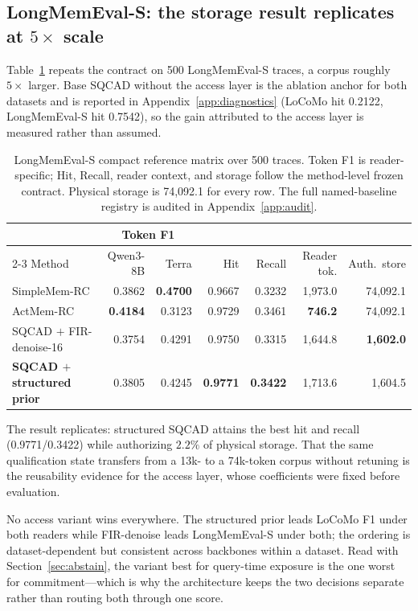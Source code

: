 \documentclass{article}
\newcommand{\SQCAD}{\textsc{SQCAD}}
\begin{document}
\subsection{LongMemEval-S: the storage result replicates at $5\times$ scale}
Table~\ref{tab:lme_models} repeats the contract on 500 LongMemEval-S traces, a
corpus roughly $5\times$ larger. Base \SQCAD{} without the access layer is the
ablation anchor for both datasets and is reported in
Appendix~\ref{app:diagnostics} (LoCoMo hit 0.2122, LongMemEval-S hit 0.7542), so
the gain attributed to the access layer is measured rather than assumed.
\begin{table}[!ht]
\caption{LongMemEval-S compact reference matrix over 500 traces. Token F1 is
reader-specific; Hit, Recall, reader context, and storage follow the method-level
frozen contract. Physical storage is 74{,}092.1 for every row. The full
named-baseline registry is audited in Appendix~\ref{app:audit}.}
\label{tab:lme_models}
\centering\small
\begin{tabular}{lrrrrrr}
\toprule
& \multicolumn{2}{c}{Token F1} & & & & \\
\cmidrule(lr){2-3}
Method & Qwen3-8B & Terra & Hit & Recall & Reader tok. & Auth.\ store \\
\midrule
SimpleMem-RC & 0.3862 & \textbf{0.4700} & 0.9667 & 0.3232 & 1,973.0 & 74,092.1 \\
ActMem-RC & \textbf{0.4184} & 0.3123 & 0.9729 & 0.3461 & \textbf{746.2} & 74,092.1 \\
SQCAD $+$ FIR-denoise-16 & 0.3754 & 0.4291 & 0.9750 & 0.3315 & 1,644.8 & \textbf{1,602.0} \\
\textbf{SQCAD $+$ structured prior} & 0.3805 & 0.4245 & \textbf{0.9771} & \textbf{0.3422} & 1,713.6 & 1,604.5 \\
\bottomrule
\end{tabular}
\end{table}

The result replicates: structured \SQCAD{} attains the best hit and recall
(0.9771/0.3422) while authorizing $2.2\%$ of physical storage. That the same
qualification state transfers from a 13k- to a 74k-token corpus without retuning is
the reusability evidence for the access layer, whose coefficients were fixed before
evaluation.

No access variant wins everywhere. The structured prior leads LoCoMo F1 under both
readers while FIR-denoise leads LongMemEval-S under both; the ordering is
dataset-dependent but consistent across backbones within a dataset. Read with
Section~\ref{sec:abstain}, the variant best for query-time exposure is the one worst
for commitment---which is why the architecture keeps the two decisions separate
rather than routing both through one score.
\end{document}
